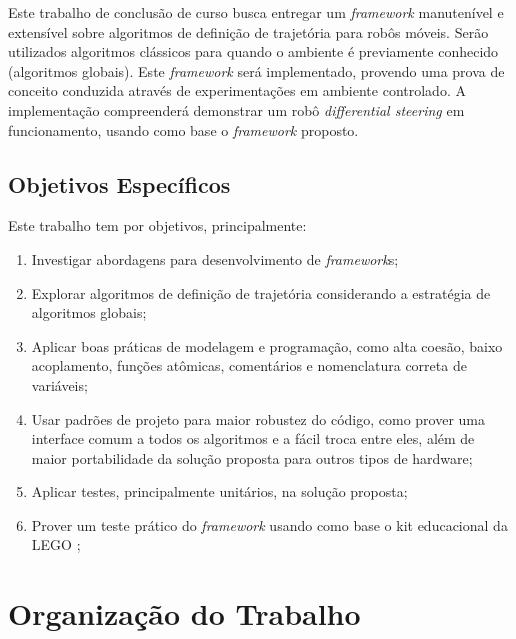 Este trabalho de conclusão de curso busca entregar um \textit{framework} manutenível e extensível sobre algoritmos de definição de trajetória para robôs móveis. Serão utilizados algoritmos clássicos para quando o ambiente é previamente conhecido (algoritmos globais). Este \textit{framework} será implementado, provendo uma prova de conceito conduzida através de experimentações em ambiente controlado. A implementação compreenderá demonstrar um robô \textit{differential steering} em funcionamento, usando como base o \textit{framework} proposto.

\subsection{Objetivos Específicos}

Este trabalho tem por objetivos, principalmente:
\begin{enumerate}
	\item Investigar abordagens para desenvolvimento de \textit{framework}s;
	\item Explorar algoritmos de definição de trajetória considerando a estratégia de algoritmos globais;
	\item Aplicar boas práticas de modelagem e programação, como alta coesão, baixo acoplamento, funções atômicas, comentários e nomenclatura correta de variáveis;
	\item Usar padrões de projeto para maior robustez do código, como prover uma interface comum a todos os algoritmos e a fácil troca entre eles, além de maior portabilidade da solução proposta para outros tipos de hardware;
	\item Aplicar testes, principalmente unitários, na solução proposta;
	\item Prover um teste prático do \textit{framework} usando como base o kit educacional da LEGO \cite{SITE_LEGO};
\end{enumerate}

\section{Organização do Trabalho}

